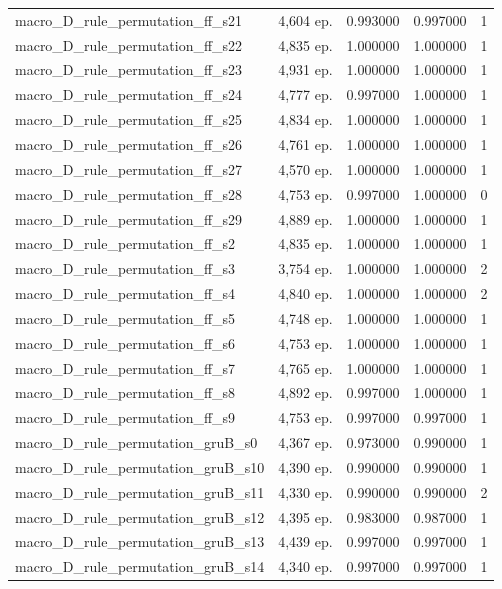 \begin{tabular}{llrrr}
macro\_D\_rule\_permutation\_ff\_s21 & 4,604 ep. & 0.993000 & 0.997000 & 1 \\
macro\_D\_rule\_permutation\_ff\_s22 & 4,835 ep. & 1.000000 & 1.000000 & 1 \\
macro\_D\_rule\_permutation\_ff\_s23 & 4,931 ep. & 1.000000 & 1.000000 & 1 \\
macro\_D\_rule\_permutation\_ff\_s24 & 4,777 ep. & 0.997000 & 1.000000 & 1 \\
macro\_D\_rule\_permutation\_ff\_s25 & 4,834 ep. & 1.000000 & 1.000000 & 1 \\
macro\_D\_rule\_permutation\_ff\_s26 & 4,761 ep. & 1.000000 & 1.000000 & 1 \\
macro\_D\_rule\_permutation\_ff\_s27 & 4,570 ep. & 1.000000 & 1.000000 & 1 \\
macro\_D\_rule\_permutation\_ff\_s28 & 4,753 ep. & 0.997000 & 1.000000 & 0 \\
macro\_D\_rule\_permutation\_ff\_s29 & 4,889 ep. & 1.000000 & 1.000000 & 1 \\
macro\_D\_rule\_permutation\_ff\_s2 & 4,835 ep. & 1.000000 & 1.000000 & 1 \\
macro\_D\_rule\_permutation\_ff\_s3 & 3,754 ep. & 1.000000 & 1.000000 & 2 \\
macro\_D\_rule\_permutation\_ff\_s4 & 4,840 ep. & 1.000000 & 1.000000 & 2 \\
macro\_D\_rule\_permutation\_ff\_s5 & 4,748 ep. & 1.000000 & 1.000000 & 1 \\
macro\_D\_rule\_permutation\_ff\_s6 & 4,753 ep. & 1.000000 & 1.000000 & 1 \\
macro\_D\_rule\_permutation\_ff\_s7 & 4,765 ep. & 1.000000 & 1.000000 & 1 \\
macro\_D\_rule\_permutation\_ff\_s8 & 4,892 ep. & 0.997000 & 1.000000 & 1 \\
macro\_D\_rule\_permutation\_ff\_s9 & 4,753 ep. & 0.997000 & 0.997000 & 1 \\
macro\_D\_rule\_permutation\_gruB\_s0 & 4,367 ep. & 0.973000 & 0.990000 & 1 \\
macro\_D\_rule\_permutation\_gruB\_s10 & 4,390 ep. & 0.990000 & 0.990000 & 1 \\
macro\_D\_rule\_permutation\_gruB\_s11 & 4,330 ep. & 0.990000 & 0.990000 & 2 \\
macro\_D\_rule\_permutation\_gruB\_s12 & 4,395 ep. & 0.983000 & 0.987000 & 1 \\
macro\_D\_rule\_permutation\_gruB\_s13 & 4,439 ep. & 0.997000 & 0.997000 & 1 \\
macro\_D\_rule\_permutation\_gruB\_s14 & 4,340 ep. & 0.997000 & 0.997000 & 1 \\

\end{tabular}

